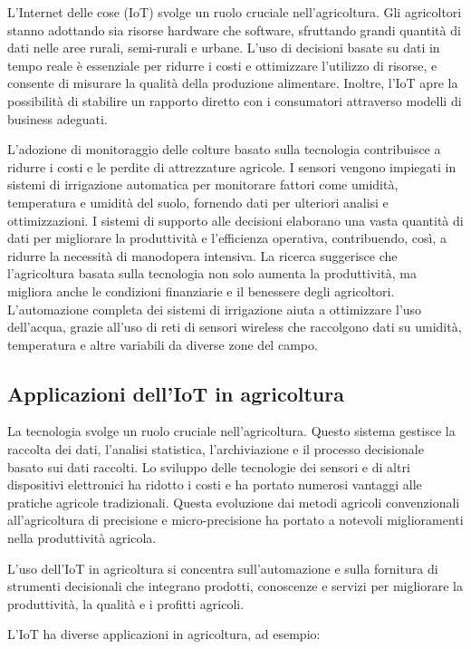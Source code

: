 L'Internet delle cose (IoT) svolge un ruolo cruciale nell'agricoltura. Gli agricoltori stanno adottando sia risorse hardware che software, sfruttando grandi quantità di dati nelle aree rurali, semi-rurali e urbane. L'uso di decisioni basate su dati in tempo reale è essenziale per ridurre i costi e ottimizzare l'utilizzo di risorse, e consente di misurare la qualità della produzione alimentare. Inoltre, l'IoT apre la possibilità di stabilire un rapporto diretto con i consumatori attraverso modelli di business adeguati.

L'adozione di monitoraggio delle colture basato sulla tecnologia contribuisce a ridurre i costi e le perdite di attrezzature agricole. I sensori vengono impiegati in sistemi di irrigazione automatica per monitorare fattori come umidità, temperatura e umidità del suolo, fornendo dati per ulteriori analisi e ottimizzazioni. I sistemi di supporto alle decisioni elaborano una vasta quantità di dati per migliorare la produttività e l'efficienza operativa, contribuendo, così, a ridurre la necessità di manodopera intensiva. La ricerca suggerisce che l'agricoltura basata sulla tecnologia non solo aumenta la produttività, ma migliora anche le condizioni finanziarie e il benessere degli agricoltori. L'automazione completa dei sistemi di irrigazione aiuta a ottimizzare l'uso dell'acqua, grazie all'uso di reti di sensori wireless che raccolgono dati su umidità, temperatura e altre variabili da diverse zone del campo.

\subsection{Applicazioni dell'IoT in agricoltura}

La tecnologia svolge un ruolo cruciale nell'agricoltura. Questo sistema gestisce la raccolta dei dati, l'analisi statistica, l'archiviazione e il processo decisionale basato sui dati raccolti. Lo sviluppo delle tecnologie dei sensori e di altri dispositivi elettronici ha ridotto i costi e ha portato numerosi vantaggi alle pratiche agricole tradizionali. Questa evoluzione dai metodi agricoli convenzionali all'agricoltura di precisione e micro-precisione ha portato a notevoli miglioramenti nella produttività agricola.

L'uso dell'IoT in agricoltura si concentra sull'automazione e sulla fornitura di strumenti decisionali che integrano prodotti, conoscenze e servizi per migliorare la produttività, la qualità e i profitti agricoli.

L'IoT ha diverse applicazioni in agricoltura, ad esempio:

